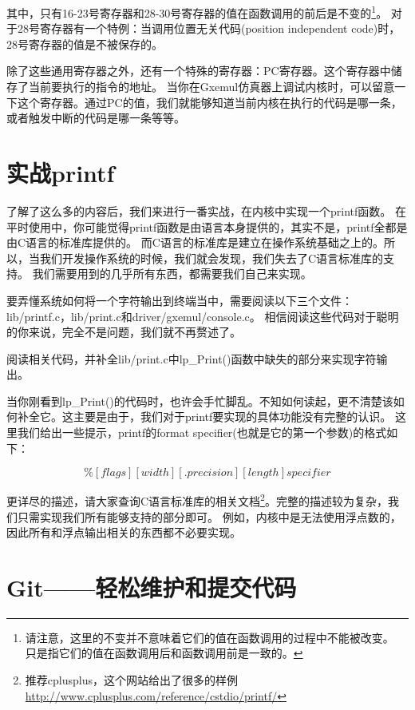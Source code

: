 其中，只有16-23号寄存器和28-30号寄存器的值在函数调用的前后是不变的\footnote{请注意，这里的不变并不意味着它们的值在函数调用的过程中不能被改变。
只是指它们的值在函数调用后和函数调用前是一致的。}。
对于28号寄存器有一个特例：当调用位置无关代码(position independent code)时，28号寄存器的值是不被保存的。

除了这些通用寄存器之外，还有一个特殊的寄存器：PC寄存器。这个寄存器中储存了当前要执行的指令的地址。
当你在Gxemul仿真器上调试内核时，可以留意一下这个寄存器。通过PC的值，我们就能够知道当前内核在执行的代码是哪一条，
或者触发中断的代码是哪一条等等。

\section{实战printf}
了解了这么多的内容后，我们来进行一番实战，在内核中实现一个printf函数。
在平时使用中，你可能觉得printf函数是由语言本身提供的，其实不是，printf全都是由C语言的标准库提供的。
而C语言的标准库是建立在操作系统基础之上的。所以，当我们开发操作系统的时候，我们就会发现，我们失去了C语言标准库的支持。
我们需要用到的几乎所有东西，都需要我们自己来实现。

要弄懂系统如何将一个字符输出到终端当中，需要阅读以下三个文件：lib/printf.c，lib/print.c和driver/gxemul/console.c。
相信阅读这些代码对于聪明的你来说，完全不是问题，我们就不再赘述了。

\begin{exercise}
阅读相关代码，并补全lib/print.c中lp\_Print()函数中缺失的部分来实现字符输出。
\end{exercise}

当你刚看到lp\_Print()的代码时，也许会手忙脚乱。不知如何读起，更不清楚该如何补全它。这主要是由于，我们对于printf要实现的具体功能没有完整的认识。
这里我们给出一些提示，printf的format specifier(也就是它的第一个参数)的格式如下：

\begin{equation*}
  \%[flags][width][.precision][length]specifier 
\end{equation*}

更详尽的描述，请大家查询C语言标准库的相关文档\footnote{推荐cplusplus，这个网站给出了很多的样例
\url{http://www.cplusplus.com/reference/cstdio/printf/}}。完整的描述较为复杂，我们只需实现我们所有能够支持的部分即可。
例如，内核中是无法使用浮点数的，因此所有和浮点输出相关的东西都不必要实现。

\section{Git——轻松维护和提交代码}

